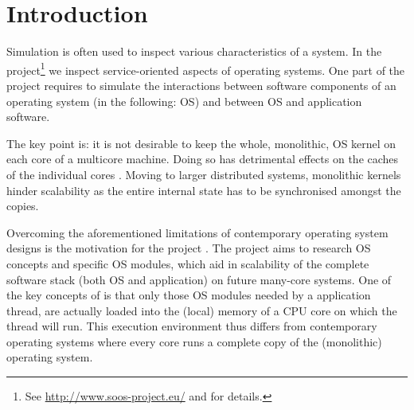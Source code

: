 \section{Introduction}

Simulation is often used to inspect various characteristics of a system.
In the \soos project\footnote{See \url{http://www.soos-project.eu/} and \cite{soos} for details.} we inspect service-oriented aspects of operating systems.
One part of the project requires to simulate the interactions between software components of an operating system (in the following: OS) and between
OS and application software.

The key point is: it is not desirable to keep the whole, monolithic, OS kernel on each core of a multicore machine.
Doing so has detrimental effects on the caches of the individual cores .
Moving to larger distributed systems, monolithic kernels hinder scalability as the entire internal state has to be synchronised amongst the copies.

Overcoming the aforementioned limitations of contemporary operating system designs is the motivation for the \soos project \cite{soos}.
The project aims to research OS concepts and specific OS modules, which aid in scalability of the complete software stack (both OS and application) on future many-core systems.
One of the key concepts of \soos is that only those OS modules needed by a application thread, are actually loaded into the (local) memory of a CPU core on which the thread will run.
This execution environment thus differs from contemporary operating systems where every core runs a complete copy of the (monolithic) operating system.

